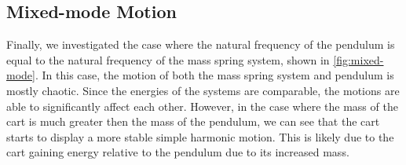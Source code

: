 \documentclass[12pt]{article}
\begin{document}
\subsection{Mixed-mode Motion}

Finally, we investigated the case where the natural frequency of the pendulum is equal to the natural frequency of the mass spring system, shown in \autoref{fig:mixed-mode}. In this case, the motion of both the mass spring system and pendulum is mostly chaotic. Since the energies of the systems are comparable, the motions are able to significantly affect each other. However, in the case where the mass of the cart is much greater then the mass of the pendulum, we can see that the cart starts to display a more stable simple harmonic motion. This is likely due to the cart gaining energy relative to the pendulum due to its increased mass.
\end{document}
